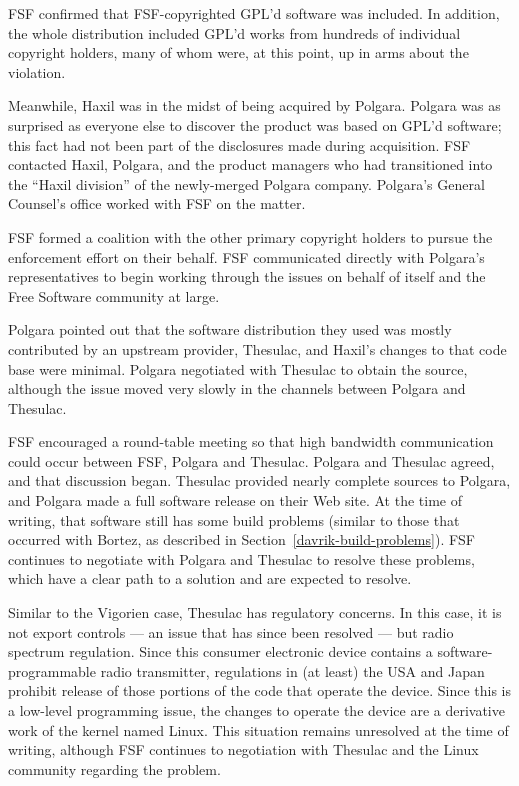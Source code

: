 {FSF confirmed that FSF-copyrighted GPL'd software was included. In
addition, the whole distribution included GPL'd works from hundreds of
individual copyright holders, many of whom were, at this point, up in
arms about the violation.

Meanwhile, Haxil was in the midst of being acquired by Polgara. Polgara
was as surprised as everyone else to discover the product was based on
GPL'd software; this fact had not been part of the disclosures made during
acquisition. FSF contacted Haxil, Polgara, and the product managers
who had transitioned into the ``Haxil division'' of the newly-merged
Polgara company. Polgara's General Counsel's office worked with FSF on
the matter.

FSF formed a coalition with the other primary copyright holders
to pursue the enforcement effort on their behalf. FSF communicated
directly with Polgara's representatives to begin working through the
issues on behalf of itself and the Free Software community at large.

Polgara pointed out that the software distribution they used was mostly
contributed by an upstream provider, Thesulac, and Haxil's changes to that
code base were minimal. Polgara negotiated with Thesulac to obtain the
source, although the issue moved very slowly in the channels between
Polgara and Thesulac.

FSF encouraged a round-table meeting so that high bandwidth communication
could occur between FSF, Polgara and Thesulac. Polgara and Thesulac
agreed, and that discussion began. Thesulac provided nearly complete
sources to Polgara, and Polgara made a full software release on their
Web site. At the time of writing, that software still has some build
problems (similar to those that occurred with Bortez, as described in
Section~\ref{davrik-build-problems}). FSF continues to negotiate with
Polgara and Thesulac to resolve these problems, which have a clear path to
a solution and are expected to resolve.

Similar to the Vigorien case, Thesulac has regulatory concerns. In this
case, it is not export controls --- an issue that has since been resolved
--- but radio spectrum regulation. Since this consumer electronic device
contains a software-programmable radio transmitter, regulations in (at
least) the USA and Japan prohibit release of those portions of the code
that operate the device. Since this is a low-level programming issue, the
changes to operate the device are a derivative work of the kernel named
Linux. This situation remains unresolved at the time of writing, although
FSF continues to negotiation with Thesulac and the Linux community
regarding the problem.

}
